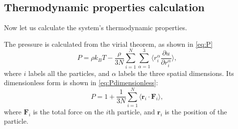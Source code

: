 \subsection{Thermodynamic properties calculation}

Now let us calculate the  system's thermodynamic properties.

The pressure is calculated from the virial theorem, as shown in \eqref{eq:P}
%
\begin{equation}\label{eq:P}
    P = \rho k_B T - \frac{ \rho }{ 3N } \sum_{i=1}^{N} \sum_{\alpha=1}^{3}
    \biggl \langle r_i^\alpha \frac{ \partial u }{ \partial r_i^\alpha } \biggr \rangle,
\end{equation}
%
where $i$ labels all the particles, and $\alpha$ labels the three spatial dimensions.
Its dimensionless form is shown in \eqref{eq:Pdimensionless}\cite{thijssen_2007}:
%
\begin{equation}\label{eq:Pdimensionless}
    P = 1 + \frac{ 1 }{ 3N } \sum_{i=1}^{N}
    \langle \bm{r}_i \cdot \bm{F}_i \rangle,
\end{equation}
%
where $\bm{F}_i$ is the total force on the $i$th particle, and $\bm{r}_i$ is the
position of the particle.
